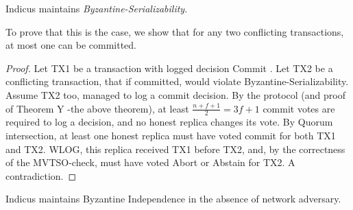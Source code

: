 \begin{theorem} 
Indicus maintains \textit{Byzantine-Serializability}.
\end{theorem}
To prove that this is the case, we show that for any two conflicting transactions, at most one can be committed.
\begin{proof}
Let TX1 be a transaction with logged decision Commit . Let TX2 be a conflicting transaction, that if committed, would violate Byzantine-Serializability. Assume TX2 too, managed to log a commit decision. By the protocol (and proof of Theorem Y -the above theorem), at least  $\frac{n+f+1}{2} = 3f+1$ commit votes are required to log a decision, and no honest replica changes its vote. By Quorum intersection, at least one honest replica must have voted commit for both TX1 and TX2. WLOG, this replica received TX1 before TX2, and, by the correctness of the MVTSO-check, must have voted Abort or Abstain for TX2. A contradiction.
\end{proof}




\begin{theorem} 
Indicus maintains Byzantine Independence in the absence of network adversary.
\end{theorem}

